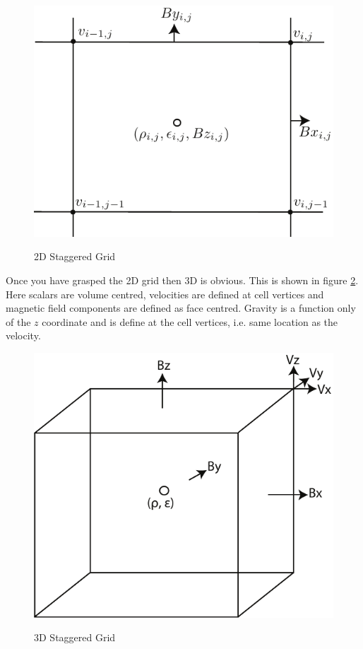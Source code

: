 \documentclass[11pt]{article}
\begin{document}
\begin{figure}
\begin{center}{\includegraphics{2d-staggered-grid.pdf}}\end{center}
\caption{2D Staggered Grid}
\label{2d-staggered}
\end{figure}

Once you have grasped the 2D grid then 3D is obvious. This is shown in figure \ref{3d-staggered}. Here scalars are 
volume centred, velocities are defined at cell vertices and magnetic field components are defined as face centred. 
Gravity is a function only of the $z$ coordinate and is define at the cell vertices, i.e. same location as the velocity.
\begin{figure}
\begin{center}{\includegraphics{3d-staggered-grid.pdf}}\end{center}
\caption{3D Staggered Grid}
\label{3d-staggered}
\end{figure}
\end{document}
